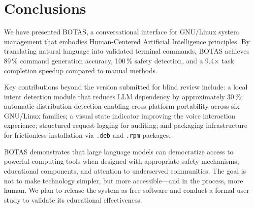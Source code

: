 \documentclass[10pt,a4paper]{article}
\begin{document}
\section{Conclusions}
\label{sec:conclusion}

We have presented BOTAS, a conversational interface for GNU/Linux system management that embodies Human-Centered Artificial Intelligence principles. By translating natural language into validated terminal commands, BOTAS achieves 89\,\% command generation accuracy, 100\,\% safety detection, and a 9.4$\times$ task completion speedup compared to manual methods.

Key contributions beyond the version submitted for blind review include: a local intent detection module that reduces LLM dependency by approximately 30\,\%; automatic distribution detection enabling cross-platform portability across six GNU/Linux families; a visual state indicator improving the voice interaction experience; structured request logging for auditing; and packaging infrastructure for frictionless installation via \texttt{.deb} and \texttt{.rpm} packages.

BOTAS demonstrates that large language models can democratize access to powerful computing tools when designed with appropriate safety mechanisms, educational components, and attention to underserved communities. The goal is not to make technology simpler, but more accessible---and in the process, more human. We plan to release the system as free software and conduct a formal user study to validate its educational effectiveness.


{
\fontsize{9}{10.8}\selectfont
\setlength{\bibhang}{0.5cm}
\setlength{\bibsep}{2pt}

}
\end{document}
